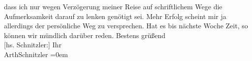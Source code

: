 \begin{ledgroupsized}[t]{13cm}
               dass ich nur wegen Verzögerung meiner Reise auf schriftlichem Wege die Aufmerksamkeit
               darauf zu lenken genötigt sei. Mehr Erfolg scheint mir ja allerdings der persönliche
               Weg zu versprechen. Hat es bis nächste Woche Zeit, so können wir mündlich darüber
               reden.\pend
           \pstart
           Bestens grüßend{\\[\baselineskip]}{[}hs. Schnitzler:{]} Ihr{\\[\baselineskip]}\spacefill\mbox{ArthSchnitzler}\pend
           \leftskip=0em{}
         
         \endnumbering{}\end{ledgroupsized}  \newcommand{\dateiname}{L01888}\newcommand{\titel}{Arthur Schnitzler an Albert Ehrenstein, 23. 11. 1909}\newcommand{\editorInnen}{Martin Anton Müller und Gerd-Hermann Susen}
      
